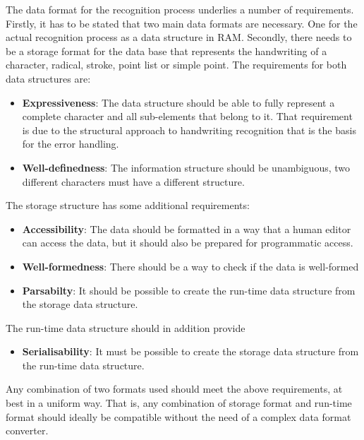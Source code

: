 The data format for the recognition process underlies a number of requirements.
Firstly, it has to be stated that two main data formats are necessary. 
One for the actual recognition process as a data structure in RAM.
Secondly, there needs to be a storage format for the data base that represents
the handwriting of a character, radical, stroke, point list or simple point.
The requirements for both data structures are:
\begin{itemize}
  \item \textbf{Expressiveness}: The data structure should be able to 
        fully represent a complete character and all sub-elements that belong 
        to it. That requirement is due to the structural approach to handwriting
        recognition that is the basis for the error handling.

  \item \textbf{Well-definedness}: The information structure should be 
        unambiguous, two different characters must have a different structure.
\end{itemize}
The storage structure has some additional requirements:
\begin{itemize}
  \item \textbf{Accessibility}: The data should be formatted in a way that a 
        human editor can access the data, but it should also be prepared for 
        programmatic access.
  \item \textbf{Well-formedness}: There should be a way to check if the data is 
        well-formed
  \item \textbf{Parsabilty}: It should be possible to create the run-time data 
        structure from the storage data structure.
\end{itemize}
The run-time data structure should in addition provide
\begin{itemize}
  \item \textbf{Serialisability}: It must be possible to create the storage 
        data structure from the run-time data structure.
\end{itemize}
Any combination of two formats used should meet the above requirements, 
at best in a uniform way. That is, any combination of storage format and 
run-time format should ideally be compatible without the need of a complex
data format converter.



